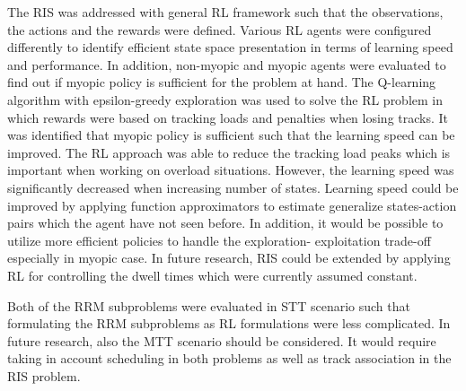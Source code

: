 \documentclass[english, 12pt, a4paper, elec, utf8, a-1b, online]{aaltothesis}
\begin{document}
The RIS was addressed with general RL framework such that the observations, the actions and the rewards were defined. Various RL agents were configured differently to identify efficient state space presentation in terms of learning speed and performance. 
In addition, non-myopic and myopic agents were evaluated to find out if myopic policy is sufficient for the problem at hand. 
The Q-learning algorithm with epsilon-greedy exploration was used to solve the RL problem in which rewards were based on tracking loads and penalties when losing tracks. 
It was identified that myopic policy is sufficient such that the learning speed can be improved. 
The RL approach was able to reduce the tracking load peaks which is important when working on overload situations.
However, the learning speed was significantly decreased when increasing number of states.
Learning speed could be improved by applying function approximators to estimate generalize states-action pairs which the agent have not seen before.  
In addition, it would be possible to utilize more efficient policies to handle the exploration- exploitation trade-off especially in myopic case.
In future research, RIS could be extended by applying RL for controlling the dwell times which were currently assumed constant.

Both of the RRM subproblems were evaluated in STT scenario such that formulating the RRM subproblems as RL formulations were less complicated. 
In future research, also the MTT scenario should be considered. 
It would require taking in account scheduling in both problems as well as track association in the RIS problem. 






\thesisbibliography

\printbibliography
\end{document}
